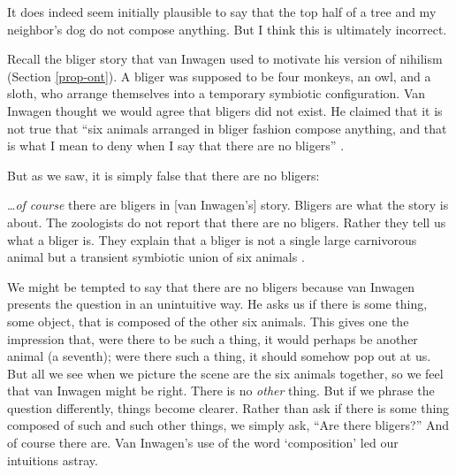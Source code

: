 \documentclass[12pt,twoside]{reedfancy}
\newenvironment{squote}{%
	\begin{spacing}{1}
	\begin{list}{}{%
	\setlength{\labelwidth}{0pt}%
	\rightmargin\leftmargin%
	}
	\item\relax
	}{%
	\end{list}%
	\end{spacing}
	}
\begin{document}
\begin{spacing}{1.25}
It does indeed seem initially plausible to say that the top half of a
tree and my neighbor's dog do not compose anything.  But I think this
is ultimately incorrect.

Recall the bliger story that van Inwagen used to motivate his version
of nihilism (Section \ref{prop-ont}).  A bliger was supposed to be
four monkeys, an owl, and a sloth, who arrange themselves into a
temporary symbiotic configuration.  Van Inwagen thought we would agree
that bligers did not exist.  He claimed that it is not true that ``six
animals arranged in bliger fashion compose anything, and that is what
I mean to deny when I say that there are no bligers''
\citeyearpar[104]{inwagen1995}.

But as we saw, it is simply false that there are no bligers:

\begin{squote}
\ldots {\em of course} there are bligers in [van Inwagen's] story.
Bligers are what the story is about.  The zoologists do not report
that there are no bligers.  Rather they tell us what a bliger is.
They explain that a bliger is not a single large carnivorous animal
but a transient symbiotic union of six animals
\citep[704]{rosenberg1993}.
\end{squote}

We might be tempted to say that there are no bligers because van
Inwagen presents the question in an unintuitive way.  He asks us if
there is some thing, some object, that is composed of the other six
animals.  This gives one the impression that, were there to be such a
thing, it would perhaps be another animal (a seventh); were there such
a thing, it should somehow pop out at us.  But all we see when we
picture the scene are the six animals together, so we feel that van
Inwagen might be right.  There is no {\em other} thing.  But if we
phrase the question differently, things become clearer.  Rather than
ask if there is some thing composed of such and such other things, we
simply ask, ``Are there bligers?''  And of course there are.  Van
Inwagen's use of the word `composition' led our intuitions astray.


\end{spacing}
\end{document}

